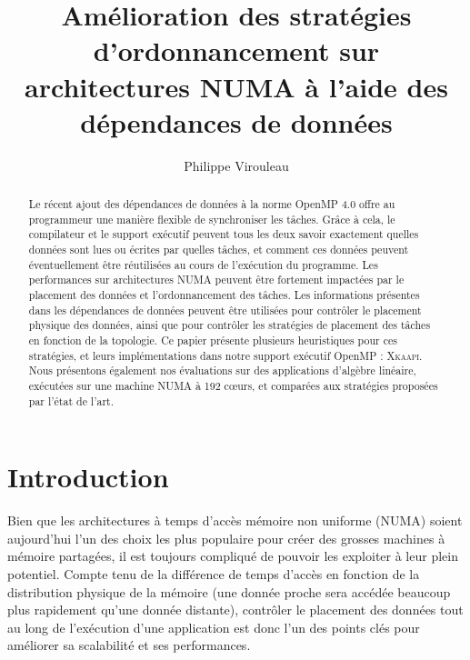 \documentclass[parallelisme]{compas2016}
\begin{document}
\title{Amélioration des stratégies d'ordonnancement sur architectures NUMA à l'aide
des dépendances de données}

\author{Philippe Virouleau}
\address{Inria,\\
   Univ. Grenoble Alpes,  CNRS, Grenoble Institute of Technology, LIG, Grenoble, France\\
   philippe.virouleau@inria.fr\\
}
\date{}


\maketitle

\newcommand{\benchs}{KASTORS }
\newcommand{\kaapi}{\textsc{\mbox{Xkaapi}}\xspace}
\begin{abstract}
Le récent ajout des dépendances de données à la norme OpenMP 4.0 offre
au programmeur une manière flexible de synchroniser les tâches.
Grâce à cela, le compilateur et le support exécutif peuvent tous les deux savoir
exactement quelles données sont lues ou écrites par quelles tâches, et comment
ces données peuvent éventuellement être réutilisées au cours de l'exécution du
programme.
Les performances sur architectures NUMA peuvent être fortement impactées par
le placement des données et l'ordonnancement des tâches. Les informations présentes
dans les dépendances de données peuvent être utilisées pour contrôler le placement physique des données,
ainsi que pour contrôler les stratégies de placement des tâches en
fonction de la topologie.
Ce papier présente plusieurs heuristiques pour ces stratégies, et leurs implémentations
dans notre support exécutif OpenMP : \kaapi.
Nous présentons également nos évaluations sur des applications d'algèbre linéaire,
exécutées sur une machine NUMA à 192 cœurs, et comparées aux stratégies proposées
par l'état de l'art.
\end{abstract}

	
\section{Introduction}

Bien que les architectures à temps d'accès mémoire non uniforme (NUMA) soient
aujourd'hui l'un des choix les plus populaire pour créer des grosses machines à mémoire
partagées, il est toujours compliqué de pouvoir les exploiter à leur plein potentiel.
Compte tenu de la différence de temps d'accès en fonction de la distribution physique
de la mémoire (une donnée proche sera accédée beaucoup plus rapidement qu'une donnée distante),
contrôler le placement des données tout au long de l'exécution d'une application
est donc l'un des points clés pour améliorer sa scalabilité et ses performances.
\end{document}
